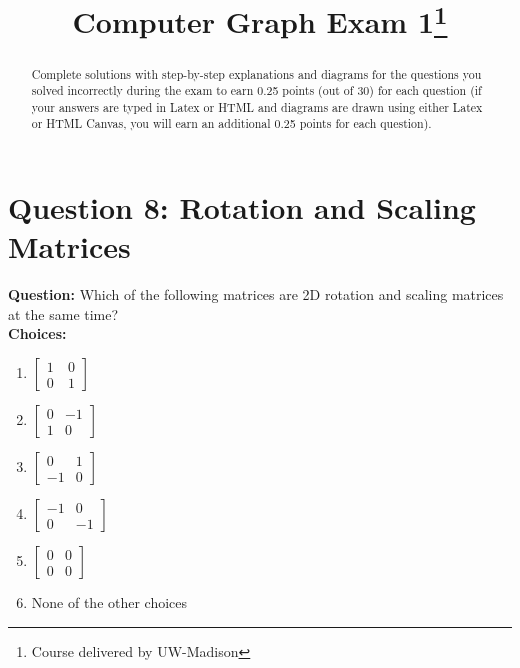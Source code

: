 \documentclass[notitlepage]{llncs}
\begin{document}
%
\title{Computer Graph Exam 1\thanks{Course delivered by UW-Madison}}
%
%
%
\maketitle
%
\begin{abstract}
Complete solutions with step-by-step explanations and diagrams for the questions you solved incorrectly during the exam to earn 0.25 points (out of 30) for each question (if your answers are typed in Latex or HTML and diagrams are drawn using either Latex or HTML Canvas, you will earn an additional 0.25 points for each question).

\end{abstract}

\newpage
\section*{Question 8: Rotation and Scaling Matrices}
\textbf{Question:} Which of the following matrices are 2D rotation and scaling matrices at the same time?
\\

\textbf{Choices:}
\begin{enumerate}
\renewcommand{\labelenumi}{\Alph{enumi}.} 
    \item $\begin{bmatrix}
            1 & \ 0 \\
            0 & \ 1
            \end{bmatrix}$\\
    \item $\begin{bmatrix}
            0 & -1 \\
            1 & 0
            \end{bmatrix}$\\
    \item $\begin{bmatrix}
            0 & 1 \\
            -1 & 0
            \end{bmatrix}$\\
    \item $\begin{bmatrix}
            -1 & 0 \\
            0 & -1
            \end{bmatrix}$\\
    \item $\begin{bmatrix}
            0 & 0 \\
            0 & 0
            \end{bmatrix}$\\
    \item None of the other choices
\end{enumerate}
\end{document}

